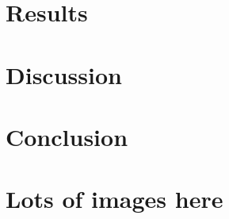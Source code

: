\documentclass{kththesis}
\begin{document}



\chapter{Results}


\chapter{Discussion}


\chapter{Conclusion}


\printbibliography[heading=bibintoc] %

\appendix

\chapter{Lots of images here}
\end{document}
